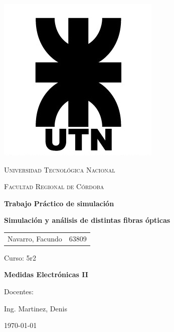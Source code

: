 \documentclass{article}
\begin{document}
\begin{titlepage}
 \centering
	\includegraphics[scale=0.80]{imagenes/LOGO.jpg} \par
 	\vspace{1cm}
 	{\scshape\LARGE Universidad Tecnológica Nacional \par}
 	{\scshape\large Facultad Regional de Córdoba \par}
 	\vspace{1cm}
	{\bfseries \Large Trabajo Práctico de simulación\par}
	{\bfseries \large Simulación y análisis de distintas fibras ópticas \par}
 	\vspace{1.5cm}

	\begin{tabular}{ll}

		Navarro, Facundo 	&	63809 	\\
	\end{tabular}
	
	\vspace{1cm}
	Curso: 5r2 \\
 	\vfill
	{\bfseries \Large Medidas Electrónicas II \par}

	\vspace{1.5cm}
	Docentes: \par
	Ing. Martinez, Denis \par

 	\vfill
	{\large \today\par}
\end{titlepage}


\tableofcontents
\clearpage
\end{document}
